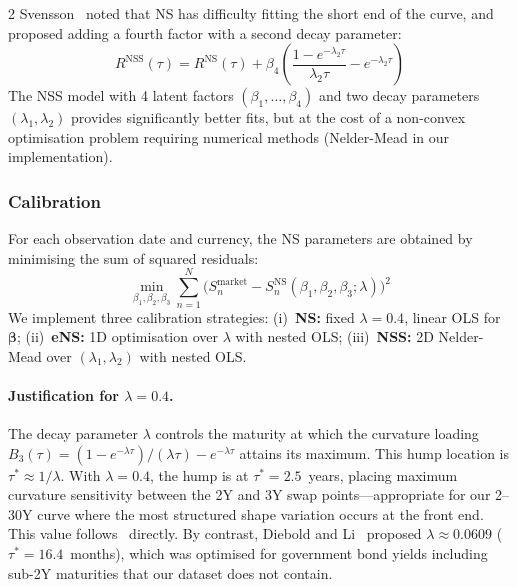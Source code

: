\documentclass[10pt,a4paper]{article}
\theoremstyle{plain}
\theoremstyle{definition}
\begin{document}
\begin{multicols}{2}
Svensson~\cite{svensson1995} noted that NS has difficulty fitting the short end of the curve, and proposed adding a fourth factor with a second decay parameter:
\begin{equation}\label{eq:nss}
R^{\text{NSS}}(\tau) = R^{\text{NS}}(\tau) + \beta_4\left(\frac{1-e^{-\lambda_2\tau}}{\lambda_2\tau} - e^{-\lambda_2\tau}\right)
\end{equation}
The NSS model with 4 latent factors $(\beta_1,\ldots,\beta_4)$ and two decay parameters $(\lambda_1, \lambda_2)$ provides significantly better fits, but at the cost of a non-convex optimisation problem requiring numerical methods (Nelder-Mead in our implementation).

\subsubsection{Calibration}

For each observation date and currency, the NS parameters are obtained by minimising the sum of squared residuals:
\begin{equation}\label{eq:ns_calibration}
\min_{\beta_1, \beta_2, \beta_3} \sum_{n=1}^{N} \bigl(S_n^{\text{market}} - S_n^{\text{NS}}(\beta_1, \beta_2, \beta_3; \lambda)\bigr)^2
\end{equation}
We implement three calibration strategies: (i)~\textbf{NS:} fixed $\lambda = 0.4$, linear OLS for $\boldsymbol{\beta}$; (ii)~\textbf{eNS:} 1D optimisation over $\lambda$ with nested OLS; (iii)~\textbf{NSS:} 2D Nelder-Mead over $(\lambda_1, \lambda_2)$ with nested OLS.

\paragraph{Justification for $\lambda = 0.4$.} The decay parameter $\lambda$ controls the maturity at which the curvature loading $B_3(\tau) = (1-e^{-\lambda\tau})/(\lambda\tau) - e^{-\lambda\tau}$ attains its maximum. This hump location is $\tau^* \approx 1/\lambda$. With $\lambda = 0.4$, the hump is at $\tau^* = 2.5$~years, placing maximum curvature sensitivity between the 2Y and 3Y swap points---appropriate for our 2--30Y curve where the most structured shape variation occurs at the front end. This value follows~\cite{sokol2022} directly. By contrast, Diebold and Li~\cite{diebold2006} proposed $\lambda \approx 0.0609$ ($\tau^* = 16.4$~months), which was optimised for government bond yields including sub-2Y maturities that our dataset does not contain.


\end{multicols}
\end{document}
